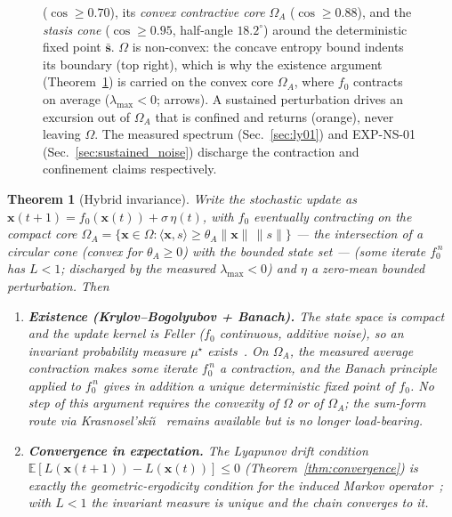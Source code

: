 \documentclass[11pt, a4paper]{article}
\newtheorem{theorem}{Theorem}
\newcommand{\E}{\mathbb{E}}
\newcommand{\sv}{\bm{x}}
\begin{document}
\begin{figure}[!htb]
{($\cos\ge0.70$), its \emph{convex contractive core} $\Omega_A$ ($\cos\ge0.88$),
and the \emph{stasis cone} ($\cos\ge0.95$, half-angle $18.2^\circ$) around the
deterministic fixed point $\bar{\bm{s}}$. $\Omega$ is non-convex: the concave
entropy bound indents its boundary (top right), which is why the existence
argument (Theorem~\ref{thm:hybrid_invariance}) is carried on the convex core
$\Omega_A$, where $f_0$ contracts on average ($\lambda_{\max}<0$; arrows).
A sustained perturbation drives an excursion out of $\Omega_A$ that is confined
and returns (orange), never leaving $\Omega$. The measured spectrum
(Sec.~\ref{sec:ly01}) and EXP-NS-01 (Sec.~\ref{sec:sustained_noise}) discharge
the contraction and confinement claims respectively.}
\label{fig:omega_nested}
\end{figure}

\begin{theorem}[Hybrid invariance]
\label{thm:hybrid_invariance}
Write the stochastic update as $\sv(t{+}1) = f_0(\sv(t)) + \sigma\,\eta(t)$,
with $f_0$ eventually contracting on the compact core
$\Omega_A = \{\sv \in \Omega : \langle \sv, s\rangle \ge \theta_A
\lVert \sv\rVert\,\lVert s\rVert\}$ --- the intersection of a circular cone
(convex for $\theta_A \ge 0$) with the bounded state set --- (some iterate
$f_0^{\,n}$ has $L<1$; discharged by the measured $\lambda_\text{max}<0$) and
$\eta$ a zero-mean bounded perturbation. Then
\begin{enumerate}
  \item \textbf{Existence (Krylov--Bogolyubov + Banach).} The state space is
        compact and the update kernel is Feller ($f_0$ continuous, additive
        noise), so an invariant probability measure $\mu^\star$
        exists~\cite{kryloff1937theorie}. On $\Omega_A$, the measured
        average contraction makes some iterate $f_0^{\,n}$ a contraction,
        and the Banach principle applied to $f_0^{\,n}$ gives in addition a
        unique deterministic fixed point of $f_0$. No step of this argument
        requires the convexity of $\Omega$ or of $\Omega_A$; the sum-form
        route via Krasnosel'ski\u{\i}~\cite{krasnoselskii1955two} remains
        available but is no longer load-bearing.
  \item \textbf{Convergence in expectation.} The Lyapunov drift condition
        $\E[L(\sv(t{+}1)) - L(\sv(t))] \le 0$ (Theorem~\ref{thm:convergence})
        is exactly the geometric-ergodicity condition for the induced Markov
        operator~\cite{meyn2009markov}; with $L<1$ the invariant measure is
        unique and the chain converges to it.

\end{enumerate}
\end{theorem}
\end{document}
